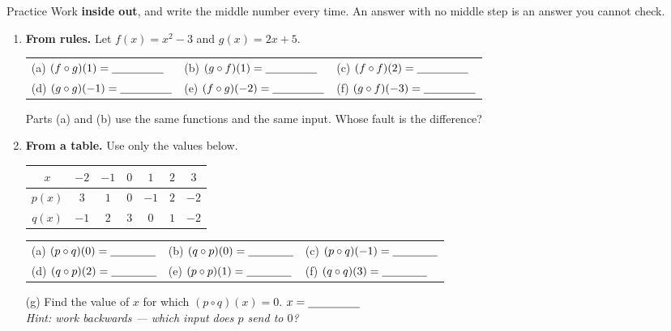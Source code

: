 \documentclass[10pt]{article}
\begin{document}
\namedateperiod

\vspace{0.10in}

\begin{notesbox}{Practice}
Work \textbf{inside out}, and write the middle number every time. An answer with no middle step is
an answer you cannot check.

\begin{enumerate}[leftmargin=1.9em, itemsep=11pt]
  \item \textbf{From rules.} Let $f(x)=x^{2}-3$ and $g(x)=2x+5$.
    \begin{center}
    \renewcommand{\arraystretch}{1.8}
    \begin{tabularx}{\linewidth}{@{}X X X@{}}
    (a) \; $(f\circ g)(1)=\blank{1.6cm}$ &
    (b) \; $(g\circ f)(1)=\blank{1.6cm}$ &
    (c) \; $(f\circ f)(2)=\blank{1.6cm}$ \\
    (d) \; $(g\circ g)(-1)=\blank{1.6cm}$ &
    (e) \; $(f\circ g)(-2)=\blank{1.6cm}$ &
    (f) \; $(g\circ f)(-3)=\blank{1.6cm}$ \\
    \end{tabularx}
    \end{center}
    Parts (a) and (b) use the same functions and the same input. Whose fault is the difference?
    \blank{6.0cm}

  \item \textbf{From a table.} Use only the values below.
    \begin{center}
    \renewcommand{\arraystretch}{1.4}
    \begin{tabular}{@{}|c|c|c|c|c|c|c|@{}}
    \hline
    $x$ & $-2$ & $-1$ & $0$ & $1$ & $2$ & $3$ \\
    \hline
    $p(x)$ & $3$ & $1$ & $0$ & $-1$ & $2$ & $-2$ \\
    \hline
    $q(x)$ & $-1$ & $2$ & $3$ & $0$ & $1$ & $-2$ \\
    \hline
    \end{tabular}
    \end{center}
    \begin{center}
    \renewcommand{\arraystretch}{1.7}
    \begin{tabularx}{\linewidth}{@{}X X X@{}}
    (a) \; $(p\circ q)(0)=\blank{1.4cm}$ &
    (b) \; $(q\circ p)(0)=\blank{1.4cm}$ &
    (c) \; $(p\circ q)(-1)=\blank{1.4cm}$ \\
    (d) \; $(q\circ p)(2)=\blank{1.4cm}$ &
    (e) \; $(p\circ p)(1)=\blank{1.4cm}$ &
    (f) \; $(q\circ q)(3)=\blank{1.4cm}$ \\
    \end{tabularx}
    \end{center}
    (g) Find the value of $x$ for which $(p\circ q)(x)=0$. \; $x=\blank{1.6cm}$ \\[2pt]
    \hspace*{0.3in}\emph{Hint: work backwards --- which input does $p$ send to $0$?}


\end{enumerate}
\end{notesbox}
\end{document}
